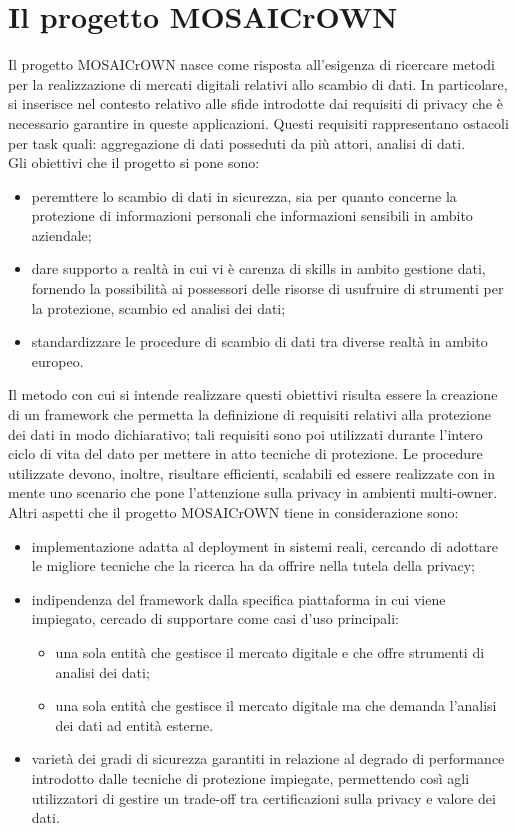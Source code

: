 \documentclass[12pt,a4paper,twoside]{book}
\begin{document}
\chapter{Il progetto MOSAICrOWN}
Il progetto MOSAICrOWN nasce come risposta all'esigenza di ricercare metodi per la realizzazione di mercati digitali relativi allo scambio di dati\cite{ProgettoMosaico}. In particolare, si inserisce nel contesto relativo alle sfide introdotte dai requisiti di privacy che è necessario garantire in queste applicazioni. Questi requisiti rappresentano ostacoli per task quali: aggregazione di dati posseduti da più attori, analisi di dati.\\
Gli obiettivi che il progetto si pone sono:
\begin{itemize}
\item peremttere lo scambio di dati in sicurezza, sia per quanto concerne la protezione di informazioni personali che informazioni sensibili in ambito aziendale;
\item dare supporto a realtà in cui vi è carenza di skills in ambito gestione dati, fornendo la possibilità ai possessori delle risorse di usufruire di strumenti per la protezione, scambio ed analisi dei dati;
\item standardizzare le procedure di scambio di dati tra diverse realtà in ambito europeo.
\end{itemize}
Il metodo con cui si intende realizzare questi obiettivi risulta essere la creazione di un framework che permetta la definizione di requisiti relativi alla protezione dei dati in modo dichiarativo; tali requisiti sono poi utilizzati durante l'intero ciclo di vita del dato per mettere in atto tecniche di protezione. Le procedure utilizzate devono, inoltre, risultare efficienti, scalabili ed essere realizzate con in mente uno scenario che pone l'attenzione sulla privacy in ambienti multi-owner.\\
Altri aspetti che il progetto MOSAICrOWN tiene in considerazione sono:
\begin{itemize}
\item implementazione adatta al deployment in sistemi reali, cercando di adottare le migliore tecniche che la ricerca ha da offrire nella tutela della privacy;
\item indipendenza del framework dalla specifica piattaforma in cui viene impiegato, cercado di supportare come casi d'uso principali:
\begin{itemize}
\item una sola entità che gestisce il mercato digitale e che offre strumenti di analisi dei dati;
\item una sola entità che gestisce il mercato digitale ma che demanda l'analisi dei dati ad entità esterne.
\end{itemize}
\item varietà dei gradi di sicurezza garantiti in relazione al degrado di performance introdotto dalle tecniche di protezione impiegate, permettendo così agli utilizzatori di gestire un trade-off tra certificazioni sulla privacy e valore dei dati.
\end{itemize}
\end{document}
